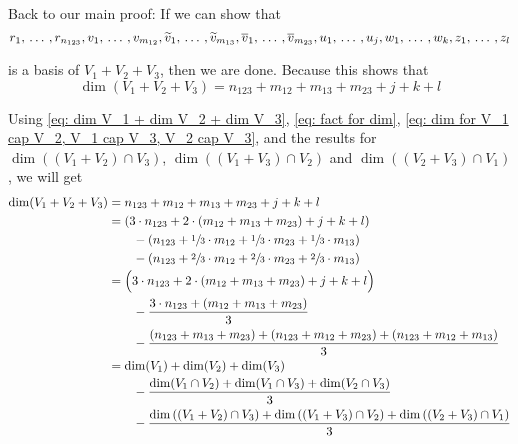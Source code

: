 \begin{xrcs}
Back to our main proof: If we can show that
\begin{equation}
  \label{eq: basis of V_1 + V_2 + V_3}
  r_1, {\, \ldots \,\,}, r_{n_{123}}, v_1, {\, \ldots \,\,}, v_{m_{12}}, \widetilde{v}_1, {\, \ldots \,\,}, \widetilde{v}_{m_{13}}, \overline{v}_1, {\, \ldots \,\,}, \overline{v}_{m_{23}}, u_1, {\, \ldots \,\,}, u_j, w_1, {\, \ldots \,\,}, w_k, z_1, {\, \ldots \,\,}, z_l
\end{equation}

is a basis of $V_1 + V_2 + V_3$, then we are done. Because this shows that
\begin{equation}
  \dim (V_1 + V_2 + V_3) = n_{123} + m_{12} + m_{13} + m_{23} + j + k + l
\end{equation}

Using \eqref{eq: dim V_1 + dim V_2 + dim V_3}, \eqref{eq: fact for dim}, \eqref{eq: dim for V_1 cap V_2, V_1 cap V_3, V_2 cap V_3}, and the results for $\dim ((V_1+V_2) \cap V_3)$, $\dim ((V_1+V_3) \cap V_2)$ and $\dim ((V_2+V_3) \cap V_1)$, we will get
\[
\begin{aligned}
  \dim (V_1 + V_2 + V_3) & = n_{123} + m_{12} + m_{13} + m_{23} + j + k + l \\
  & = \left(3 \cdot n_{123} + 2 \cdot (m_{12}+m_{13}+m_{23})+j+k+l \right) \\
  & \qquad - \left(n_{123} + \sfrac{1}{3} \cdot m_{12} + \sfrac{1}{3} \cdot m_{23} + \sfrac{1}{3} \cdot m_{13} \right) \\
  & \qquad - \left(n_{123}+\sfrac{2}{3} \cdot m_{12} + \sfrac{2}{3} \cdot m_{23} + \sfrac{2}{3} \cdot m_{13} \right) \\
  & = \Big(3 \cdot n_{123} + 2 \cdot (m_{12}+m_{13}+m_{23})+j+k+l \Big) \\
  & \qquad - \frac{3 \cdot n_{123}+(m_{12}+m_{13}+m_{23}) }{3} \\
  & \qquad - \frac{(n_{123} + m_{13} + m_{23})+(n_{123} + m_{12} + m_{23})+(n_{123} + m_{12} + m_{13})}{3} \\
  & = \dim (V_1) + \dim (V_2) + \dim (V_3) \\
  & \qquad - \frac{\dim (V_1 \cap V_2) + \dim (V_1 \cap V_3) + \dim (V_2 \cap V_3)}{3} \\
  & \qquad - \frac{ \dim \left(  (V_1 + V_2) \cap V_3 \right) + \dim \left( (V_1 + V_3) \cap V_2 \right)+ \dim \left( (V_2 + V_3) \cap V_1 \right) }{3} \\
\end{aligned}
\]


\end{xrcs}
